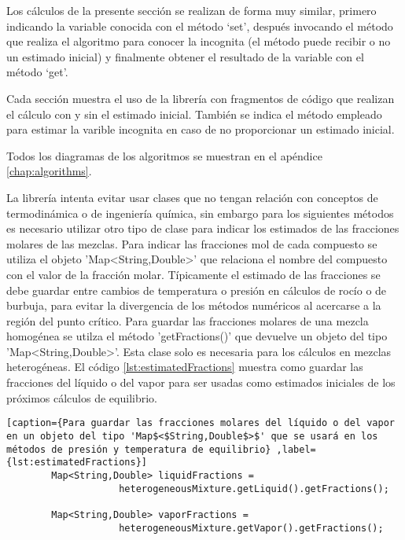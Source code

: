 	Los cálculos de la presente sección se realizan de forma muy similar, primero indicando la variable conocida con el método `set', después invocando el método que realiza el algoritmo para conocer la incognita (el método puede recibir o no un estimado inicial) y finalmente obtener el resultado de la variable con el método `get'.

	Cada sección muestra el uso de la librería con fragmentos de código que realizan el cálculo con y sin el estimado inicial. También se indica el método empleado para estimar la varible incognita en caso de no proporcionar un estimado inicial.

	Todos los diagramas de los algoritmos se muestran en el apéndice \ref{chap:algorithms}.

	La librería \Materia intenta evitar usar clases que no tengan relación con conceptos de termodinámica o de ingeniería química, sin embargo para los siguientes métodos es necesario utilizar otro tipo de clase para indicar los estimados de las fracciones molares de las mezclas. Para indicar las fracciones mol de cada compuesto se utiliza el objeto 'Map<String,Double>' que relaciona el nombre del compuesto con el valor de la fracción molar. Típicamente el estimado de las fracciones se debe guardar entre cambios de temperatura o presión en cálculos de rocío o de burbuja, para evitar la divergencia de los métodos numéricos al acercarse a la región del punto crítico. Para guardar las fracciones molares de una mezcla homogénea se utilza el método 'getFractions()' que devuelve un objeto del tipo 'Map<String,Double>'. Esta clase solo es necesaria para los cálculos en mezclas heterogéneas. El código \ref{lst:estimatedFractions} muestra como guardar las fracciones del líquido o del vapor para ser usadas como estimados iniciales de los próximos cálculos de equilibrio.


	\begin{lstlisting}[caption={Para guardar las fracciones molares del líquido o del vapor en un objeto del tipo 'Map$<$String,Double$>$' que se usará en los métodos de presión y temperatura de equilibrio} ,label={lst:estimatedFractions}]
		Map<String,Double> liquidFractions = 
					heterogeneousMixture.getLiquid().getFractions();

		Map<String,Double> vaporFractions = 
					heterogeneousMixture.getVapor().getFractions();
		
	\end{lstlisting}

		

		